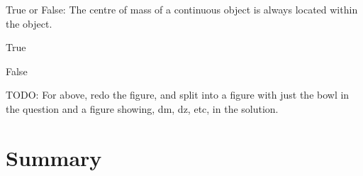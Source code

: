 \begin{checkpoint}
\begin{MCquestion}{True or False: The centre of mass of a continuous object is always located within the object.}
\item True
\item False %
\end{MCquestion}
\end{checkpoint}

TODO: For above, redo the figure, and split into a figure with just the bowl in the question and a figure showing, dm, dz, etc, in the solution.

\newpage
\section{Summary}

